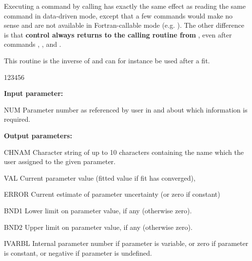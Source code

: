 Executing a command by calling  has exactly the same
effect as reading the same command in data-driven mode, except that
a few commands would make no sense and are not available in
Fortran-callable mode (e.g. ).
The other difference is that {\bf control always returns to the
calling routine from }, even after commands ,
, and .
 

This routine is the inverse of  and
can for instance be used after a fit.

 
\begin{DLtt}{123456}
\item[{\rm\bf Input parameter:}]
\item[NUM]    Parameter number as referenced by user in  and
              about which information is required.
\item[{\rm\bf Output parameters:}]
\item[CHNAM]  Character string of up to 10 characters containing
              the name which the user assigned to the given parameter.
\item[VAL]    Current parameter value (fitted value if fit has converged),
\item[ERROR]  Current estimate of parameter uncertainty (or zero if constant)
\item[BND1]   Lower limit on parameter value, if any (otherwise zero).
\item[BND2]   Upper limit on parameter value, if any (otherwise zero).
\item[IVARBL] Internal parameter number if parameter is variable, or
              zero if parameter is constant, or negative if parameter is undefined.
\end{DLtt}
 

 
